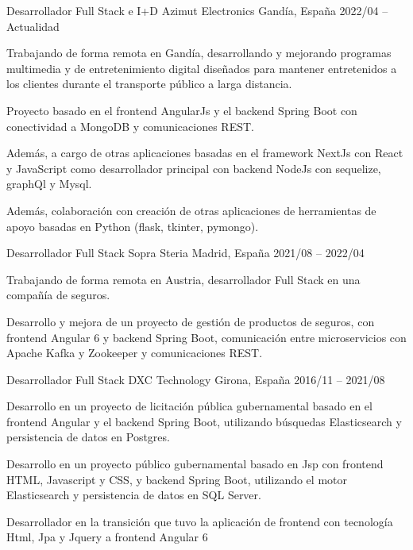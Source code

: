 \documentclass[]{awesome-cv}
\begin{document}
\begin{cventries}
	\cventry
	{Desarrollador Full Stack e I+D}
	{Azimut Electronics}
	{Gandía, España}
	{2022/04 – Actualidad}
	{\begin{cvitems}
		\vspace{0.5mm}
		\item {Trabajando de forma remota en Gandía, desarrollando y mejorando programas multimedia y de entretenimiento digital diseñados para mantener entretenidos a los clientes durante el transporte público a larga distancia.}
		\item {Proyecto basado en el frontend AngularJs y el backend Spring Boot con conectividad a MongoDB y comunicaciones REST.}
        \item {Además, a cargo de otras aplicaciones basadas en el framework NextJs con React y JavaScript como desarrollador principal con backend NodeJs con sequelize, graphQl y Mysql.}
        \item {Además, colaboración con creación de otras aplicaciones de herramientas de apoyo basadas en Python (flask, tkinter, pymongo).}
		\end{cvitems}}

	\cventry
	{Desarrollador Full Stack}
	{Sopra Steria}
	{Madrid, España}
	{2021/08 – 2022/04}
	{\begin{cvitems}
		\vspace{0.5mm}
		\item {Trabajando de forma remota en Austria, desarrollador Full Stack en una compañía de seguros.}
		\item {Desarrollo y mejora de un proyecto de gestión de productos de seguros, con frontend Angular 6 y backend Spring Boot, comunicación entre microservicios con Apache Kafka y Zookeeper y comunicaciones REST.}
		\end{cvitems}}

	\cventry
	{Desarrollador Full Stack}
	{DXC Technology}
	{Girona, España}
	{2016/11 – 2021/08}
	{\begin{cvitems}
		\vspace{0.5mm}
		\item {Desarrollo en un proyecto de licitación pública gubernamental basado en el frontend Angular y el backend Spring Boot, utilizando búsquedas Elasticsearch y persistencia de datos en Postgres.}
  \item {Desarrollo en un proyecto público gubernamental basado en Jsp con frontend HTML, Javascript y CSS, y backend Spring Boot, utilizando el motor Elasticsearch y persistencia de datos en SQL Server.}
  \item {Desarrollador en la transición que tuvo la aplicación de frontend con tecnología Html, Jpa y Jquery a frontend Angular 6}
		\end{cvitems}}


\end{cventries}
\end{document}
